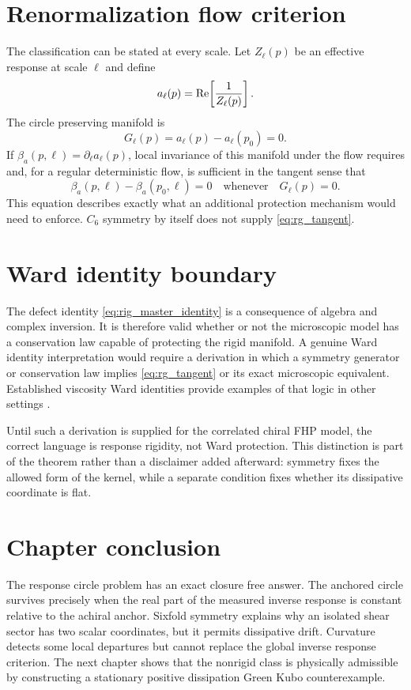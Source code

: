 \section{Renormalization flow criterion}
The classification can be stated at every scale. Let $Z_\ell(p)$ be an effective response at scale $\ell$ and define
\begin{equation}
 a_\ell(p)=\operatorname{Re}\!\left[\frac1{Z_\ell(p)}\right].
 \label{eq:scale_a}
\end{equation}
The circle preserving manifold is
\begin{equation}
 G_\ell(p)=a_\ell(p)-a_\ell(p_0)=0.
 \label{eq:rigid_manifold}
\end{equation}
If $\beta_a(p,\ell)=\partial_\ell a_\ell(p)$, local invariance of this manifold under the flow requires and, for a regular deterministic flow, is sufficient in the tangent sense that
\begin{equation}
 \beta_a(p,\ell)-\beta_a(p_0,\ell)=0
 \quad\text{whenever}\quad G_\ell(p)=0.
 \label{eq:rg_tangent}
\end{equation}
This equation describes exactly what an additional protection mechanism would need to enforce. $C_6$ symmetry by itself does not supply \cref{eq:rg_tangent}.

\section{Ward identity boundary}
The defect identity \cref{eq:rig_master_identity} is a consequence of algebra and complex inversion. It is therefore valid whether or not the microscopic model has a conservation law capable of protecting the rigid manifold. A genuine Ward identity interpretation would require a derivation in which a symmetry generator or conservation law implies \cref{eq:rg_tangent} or its exact microscopic equivalent. Established viscosity Ward identities provide examples of that logic in other settings \cite{Bradlyn2012}.

Until such a derivation is supplied for the correlated chiral FHP model, the correct language is response rigidity, not Ward protection. This distinction is part of the theorem rather than a disclaimer added afterward: symmetry fixes the allowed form of the kernel, while a separate condition fixes whether its dissipative coordinate is flat.

\section{Chapter conclusion}
The response circle problem has an exact closure free answer. The anchored circle survives precisely when the real part of the measured inverse response is constant relative to the achiral anchor. Sixfold symmetry explains why an isolated shear sector has two scalar coordinates, but it permits dissipative drift. Curvature detects some local departures but cannot replace the global inverse response criterion. The next chapter shows that the nonrigid class is physically admissible by constructing a stationary positive dissipation Green Kubo counterexample.

